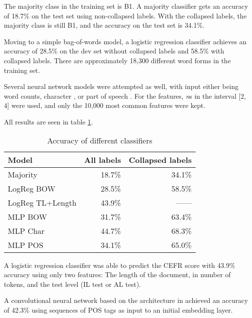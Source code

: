 The majority class in the training set is B1. A majority classifier gets an
accuracy of 18.7\% on the test set using non-collapsed labels. With the
collapsed labels, the majority class is still B1, and the accuracy on the
test set is 34.1\%.

Moving to a simple bag-of-words model, a logistic regression classifier
achieves an accuracy of 28.5\% on the dev set without collapsed labels and
58.5\% with collapsed labels. There are approximately 18,300 different word
forms in the training set.

Several neural network models were attempted as well, with input either
being word counts, character \ngrams, or part of speech \ngrams.  For
the \ngram features, \textit{n}s in the interval [2, 4] were used, and
only the 10,000 most common features were kept.

All results are seen in table \ref{baseline-accuracies}.

\begin{table}
  \centering
  \begin{tabular}{lrr}
    \toprule
    Model            & All labels & Collapsed labels \\
    \midrule
    Majority         &     18.7\% &           34.1\% \\
    LogReg BOW       &     28.5\% &           58.5\% \\
    LogReg TL+Length &     43.9\% &           ------ \\
    MLP BOW          &     31.7\% &           63.4\% \\
    MLP Char         &     44.7\% &           68.3\% \\
    MLP POS          &     34.1\% &           65.0\% \\
    \bottomrule
  \end{tabular}
  \caption{Accuracy of different classifiers}
  \label{baseline-accuracies}
\end{table}

A logistic regression classifier was able to predict the CEFR score with
43.9\% accuracy using only two features: The length of the document, in
number of tokens, and the test level (IL test or AL test).

A convolutional neural network based on the architecture in
\textcite{zhang2017sensitivity} achieved an accuracy of 42.3\% using
sequences of POS tags as input to an initial embedding layer.
